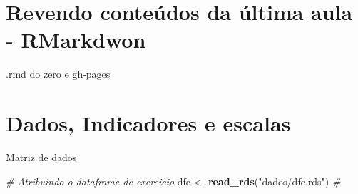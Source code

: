 \documentclass[
  9pt,
  ignorenonframetext,
  aspectratio=169]{beamer}
\subtitle{Métodos Quantitativos Aplicados à Ciência Política}
\author{Frederico Bertholini}
\date{16.nov.2020}
\newenvironment{Shaded}{\begin{snugshade}}{\end{snugshade}}
\newcommand{\CommentTok}[1]{\textcolor[rgb]{0.56,0.35,0.01}{\textit{#1}}}
\newcommand{\KeywordTok}[1]{\textcolor[rgb]{0.13,0.29,0.53}{\textbf{#1}}}
\newcommand{\NormalTok}[1]{#1}
\newcommand{\StringTok}[1]{\textcolor[rgb]{0.31,0.60,0.02}{#1}}
\begin{document}
\begin{frame}[allowframebreaks]
  \tableofcontents[hideallsubsections]
\end{frame}
\hypertarget{revendo-conteuxfados-da-uxfaltima-aula---rmarkdwon}{%
\section{Revendo conteúdos da última aula -
RMarkdwon}\label{revendo-conteuxfados-da-uxfaltima-aula---rmarkdwon}}

\begin{frame}{.rmd do zero e gh-pages}
\protect\hypertarget{rmd-do-zero-e-gh-pages}{}
\end{frame}

\hypertarget{dados-indicadores-e-escalas}{%
\section{Dados, Indicadores e
escalas}\label{dados-indicadores-e-escalas}}

\begin{frame}[fragile]{Matriz de dados}
\protect\hypertarget{matriz-de-dados}{}
\begin{Shaded}
\begin{Highlighting}[]
\CommentTok{\# Atribuindo o dataframe de exercicio}
\NormalTok{dfe \textless{}{-}}\StringTok{ }\KeywordTok{read\_rds}\NormalTok{(}\StringTok{"dados/dfe.rds"}\NormalTok{)}
\CommentTok{\#}
\end{Highlighting}
\end{Shaded}
\end{frame}
\end{document}
